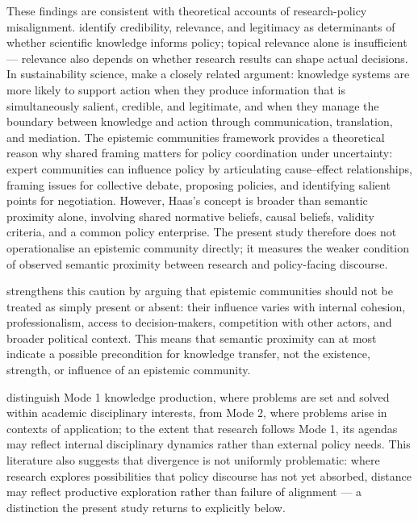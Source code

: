 \documentclass[12pt,a4paper]{article}
\begin{document}
These findings are consistent with theoretical accounts of research-policy misalignment. \textcite{Heink2015} identify credibility, relevance, and legitimacy as determinants of whether scientific knowledge informs policy; topical relevance alone is insufficient --- relevance also depends on whether research results can shape actual decisions. In sustainability science, \textcite{Cash2003} make a closely related argument: knowledge systems are more likely to support action when they produce information that is simultaneously salient, credible, and legitimate, and when they manage the boundary between knowledge and action through communication, translation, and mediation. The epistemic communities framework \parencite{Haas1992} provides a theoretical reason why shared framing matters for policy coordination under uncertainty: expert communities can influence policy by articulating cause--effect relationships, framing issues for collective debate, proposing policies, and identifying salient points for negotiation. However, Haas's concept is broader than semantic proximity alone, involving shared normative beliefs, causal beliefs, validity criteria, and a common policy enterprise. The present study therefore does not operationalise an epistemic community directly; it measures the weaker condition of observed semantic proximity between research and policy-facing discourse.

\textcite{Cross2013} strengthens this caution by arguing that epistemic communities should not be treated as simply present or absent: their influence varies with internal cohesion, professionalism, access to decision-makers, competition with other actors, and broader political context. This means that semantic proximity can at most indicate a possible precondition for knowledge transfer, not the existence, strength, or influence of an epistemic community.

\textcite{Gibbons1994} distinguish Mode 1 knowledge production, where problems are set and solved within academic disciplinary interests, from Mode 2, where problems arise in contexts of application; to the extent that research follows Mode 1, its agendas may reflect internal disciplinary dynamics rather than external policy needs. This literature also suggests that divergence is not uniformly problematic: where research explores possibilities that policy discourse has not yet absorbed, distance may reflect productive exploration rather than failure of alignment --- a distinction the present study returns to explicitly below.
\end{document}
